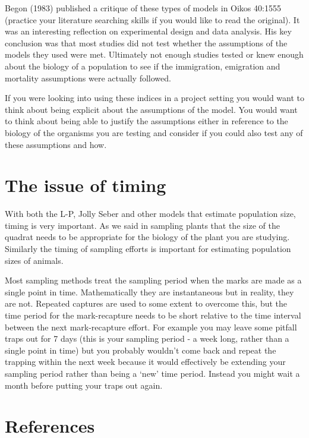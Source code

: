 \documentclass[
  letterpaper,
  DIV=11,
  numbers=noendperiod]{scrreprt}
\begin{document}
Begon (1983) published a critique of these types of models in Oikos
40:1555 (practice your literature searching skills if you would like to
read the original). It was an interesting reflection on experimental
design and data analysis. His key conclusion was that most studies did
not test whether the assumptions of the models they used were met.
Ultimately not enough studies tested or knew enough about the biology of
a population to see if the immigration, emigration and mortality
assumptions were actually followed.

If you were looking into using these indices in a project setting you
would want to think about being explicit about the assumptions of the
model. You would want to think about being able to justify the
assumptions either in reference to the biology of the organisms you are
testing and consider if you could also test any of these assumptions and
how.

\section{The issue of timing}\label{the-issue-of-timing}

With both the L-P, Jolly Seber and other models that estimate population
size, timing is very important. As we said in sampling plants that the
size of the quadrat needs to be appropriate for the biology of the plant
you are studying. Similarly the timing of sampling efforts is important
for estimating population sizes of animals.

Most sampling methods treat the sampling period when the marks are made
as a single point in time. Mathematically they are instantaneous but in
reality, they are not. Repeated captures are used to some extent to
overcome this, but the time period for the mark-recapture needs to be
short relative to the time interval between the next mark-recapture
effort. For example you may leave some pitfall traps out for 7 days
(this is your sampling period - a week long, rather than a single point
in time) but you probably wouldn't come back and repeat the trapping
within the next week because it would effectively be extending your
sampling period rather than being a `new' time period. Instead you might
wait a month before putting your traps out again.

\section{References}\label{references}
\end{document}
